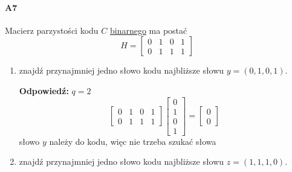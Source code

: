 \paragraph{A7} Macierz parzystości kodu $C$ \underline{binarnego} ma postać
$$H =
\begin{bmatrix}
0& 1& 0& 1\\
0& 1& 1& 1 
\end{bmatrix}$$
\begin{enumerate}[label=\alph*)]
\item znajdź przynajmniej jedno słowo kodu najbliższe słowu $y = (0, 1, 0, 1)$.

\textbf{Odpowiedź: }$q=2$
$$\begin{bmatrix}
0& 1& 0& 1\\
0& 1& 1& 1 
\end{bmatrix}\begin{bmatrix}
0\\1\\0\\1
\end{bmatrix}=\begin{bmatrix}
0\\0
\end{bmatrix}$$
słowo $y$ należy do kodu, więc nie trzeba szukać słowa 
\item znajdź przynajmniej jedno słowo kodu najbliższe słowu $z = (1, 1, 1, 0)$.


\end{enumerate}
